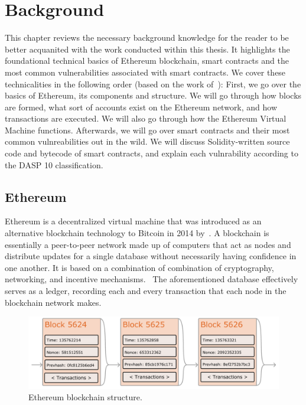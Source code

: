 
\chapter{Background}
\label{chap:background}
    This chapter reviews the necessary background knowledge for the reader to be better acquanited with the work conducted within this thesis.
    It highlights the foundational technical basics of Ethereum blockchain, smart contracts and the most common vulnerabilities associated with smart contracts.
    We cover these technicalities in the following order (based on the work of~\cite{ferreira2022smart}):
        First, we go over the basics of Ethereum, its components and structure. We will go through how blocks are formed,
        what sort of accounts exist on the Ethereum network, and how transactions are executed.
        We will also go through how the Ethereum Virtual Machine functions.
        Afterwards, we will go over smart contracts and their most common vulnreabilities out in the wild.
        We will discuss Solidity-written source code and bytecode of smart contracts, and explain each vulnrability according to the DASP 10 classification.~\cite{dasp}


\section{Ethereum}
    Ethereum is a decentralized virtual machine that was introduced as an alternative blockchain technology to Bitcoin in 2014 by~\cite{wood2014ethereum}.
    A blockchain is essentially a peer-to-peer network made up of computers that act as nodes and distribute updates for a single database without necessarily having confidence in one another.
    It is based on a combination of combination of cryptography, networking, and incentive mechanisms.~\cite{wohrer2018smart}
    The aforementioned database effectively serves as a ledger, recording each and every transaction that each node in the blockchain network makes. 


    \begin{figure}
        \centering
        \includegraphics[width=\textwidth]{figures/ethereum-blocks.png}
        \caption{Ethereum blockchain structure.}
        \label{fig:ethereumBlockchainStructure}
    \end{figure}

